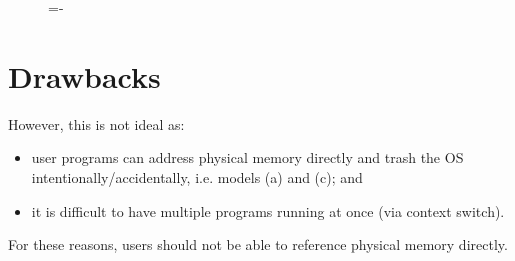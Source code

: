 \documentclass[a4paper]{systems-software}
\begin{document}
\begin{figure}[H]
  \lineskip=-\fboxrule
\end{figure}


\newpage

\section*{Drawbacks}

However, this is not ideal as:
\begin{itemize}
	\item user programs can address physical memory directly and trash the OS intentionally/accidentally, i.e. models (a) and (c); and
	\item it is difficult to have multiple programs running at once (via context switch).
\end{itemize}

For these reasons, users should not be able to reference physical memory directly.
\end{document}
